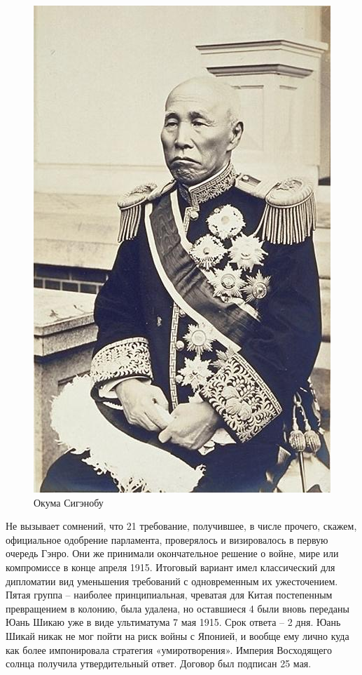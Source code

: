 \begin{figure}[h!tb] 
	\centering\includegraphics[scale=0.4]{Glava4/-n7yRkLYs2g.jpg}
	\caption{Окума Сигэнобу}%
\end{figure}

Не вызывает сомнений, что 21 требование, получившее, в числе прочего, скажем, официальное одобрение парламента, проверялось и визировалось в первую очередь Гэнро. Они же принимали окончательное решение о войне, мире или компромиссе в конце апреля 1915. Итоговый вариант имел классический для дипломатии вид уменьшения требований с одновременным их ужесточением. Пятая группа – наиболее принципиальная, чреватая для Китая постепенным превращением в колонию, была удалена, но оставшиеся 4 были вновь переданы Юань Шикаю уже в виде ультиматума 7 мая 1915. Срок ответа – 2 дня. Юань Шикай никак не мог пойти на риск войны с Японией, и вообще ему лично куда как более импонировала стратегия «умиротворения». Империя Восходящего солнца получила утвердительный ответ. Договор был подписан 25 мая.

